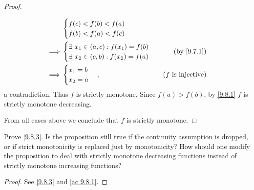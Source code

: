 \begin{proof}
\begin{itemize}
\begin{align*}
                     & \begin{cases}
                         f(c) < f(b) < f(a) \\
                         f(b) < f(a) < f(c)
                       \end{cases}                                                      \\
            \implies & \begin{cases}
                         \exists\ x_1 \in (a, c) : f(x_1) = f(b) \\
                         \exists\ x_2 \in (c, b) : f(x_2) = f(a) \\
                       \end{cases} & \text{(by \cref{9.7.1})}                                 \\
            \implies & \begin{cases}
                         x_1 = b \\
                         x_2 = a
                       \end{cases},                              & \text{(\(f\) is injective)}
          \end{align*}
          a contradiction.
          Thus \(f\) is strictly monotone.
          Since \(f(a) > f(b)\), by \cref{9.8.1} \(f\) is strictly monotone decreasing.
  \end{itemize}
  From all cases above we conclude that \(f\) is strictly monotone.
\end{proof}

\begin{exercise}\label{ex 9.8.4}
  Prove \cref{9.8.3}.
  Is the proposition still true if the continuity assumption is dropped, or if strict monotonicity is replaced just by monotonicity?
  How should one modify the proposition to deal with strictly monotone decreasing functions instead of strictly monotone increasing functions?
\end{exercise}

\begin{proof}
  See \cref{9.8.3} and \cref{ac 9.8.1}.
\end{proof}

